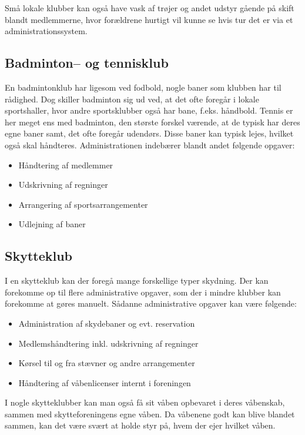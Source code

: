Små lokale klubber kan også have vask af trøjer og andet udstyr gående på skift blandt medlemmerne, hvor
forældrene hurtigt vil kunne se hvis tur det er via et administrationssystem.


\subsection{Badminton-- og tennisklub}

En badmintonklub har ligesom ved fodbold, nogle baner som klubben har til rådighed. Dog skiller badminton sig
ud ved, at det ofte foregår i lokale sportshaller, hvor andre sportsklubber også har bane, f.eks. håndbold.
Tennis er her meget ens med badminton, den største forskel værende, at de typisk har deres egne baner samt,
det ofte foregår udendørs. Disse baner kan typisk lejes, hvilket også skal håndteres. Administrationen
indebærer blandt andet følgende opgaver:

\begin{itemize}
  \item Håndtering af medlemmer
  \item Udskrivning af regninger
  \item Arrangering af sportsarrangementer
  \item Udlejning af baner
\end{itemize}


\subsection{Skytteklub}

I en skytteklub kan der foregå mange forskellige typer skydning. Der kan forekomme op til flere administrative
opgaver, som der i mindre klubber kan forekomme at gøres manuelt. Sådanne administrative opgaver kan være følgende:

\begin{itemize}
  \item Administration af skydebaner og evt. reservation
  \item Medlemshåndtering inkl. udskrivning af regninger
  \item Kørsel til og fra stævner og andre arrangementer
  \item Håndtering af våbenlicenser internt i foreningen
\end{itemize}

I nogle skytteklubber kan man også få sit våben opbevaret i deres våbenskab, sammen med skytteforeningens egne
våben. Da våbenene godt kan blive blandet sammen, kan det være svært at holde styr på, hvem der ejer hvilket
våben. 


